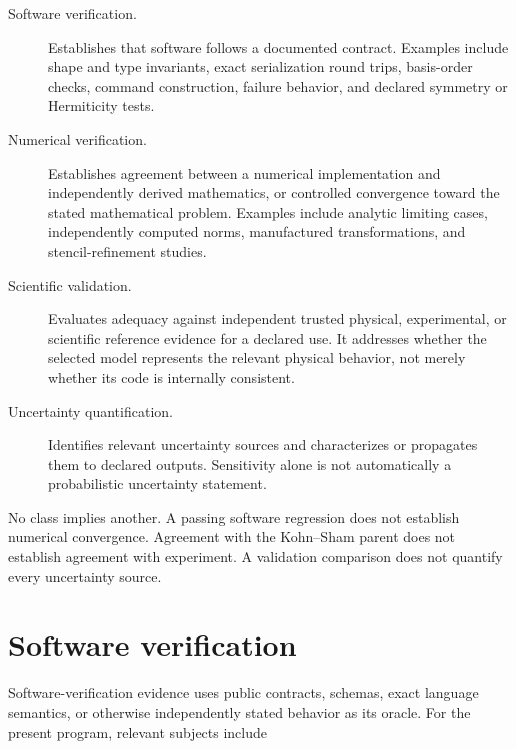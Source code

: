 \begin{description}
  \item[Software verification.] Establishes that software follows a documented
    contract. Examples include shape and type invariants, exact serialization
    round trips, basis-order checks, command construction, failure behavior,
    and declared symmetry or Hermiticity tests.
  \item[Numerical verification.] Establishes agreement between a numerical
    implementation and independently derived mathematics, or controlled
    convergence toward the stated mathematical problem. Examples include
    analytic limiting cases, independently computed norms, manufactured
    transformations, and stencil-refinement studies.
  \item[Scientific validation.] Evaluates adequacy against independent trusted
    physical, experimental, or scientific reference evidence for a declared
    use. It addresses whether the selected model represents the relevant
    physical behavior, not merely whether its code is internally consistent.
  \item[Uncertainty quantification.] Identifies relevant uncertainty sources and
    characterizes or propagates them to declared outputs. Sensitivity alone is
    not automatically a probabilistic uncertainty statement.
\end{description}

No class implies another. A passing software regression does not establish
numerical convergence. Agreement with the Kohn--Sham parent does not establish
agreement with experiment. A validation comparison does not quantify every
uncertainty source.

\section{Software verification}

Software-verification evidence uses public contracts, schemas, exact language
semantics, or otherwise independently stated behavior as its oracle. For the
present program, relevant subjects include


